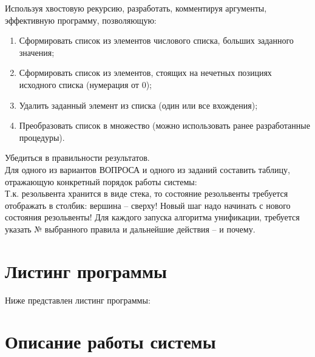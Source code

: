 \Large Используя хвостовую рекурсию, разработать, комментируя аргументы, эффективную программу, позволяющую:

\begin{enumerate}
	\item Сформировать список из элементов числового списка, больших заданного значения;
	\item Сформировать список из элементов, стоящих на нечетных позициях исходного списка (нумерация от 0);
	\item Удалить заданный элемент из списка (один или все вхождения);
	\item Преобразовать список в множество (можно использовать ранее разработанные процедуры).
\end{enumerate}
Убедиться в правильности результатов.\\
Для одного из вариантов ВОПРОСА и одного из заданий  составить таблицу, отражающую конкретный порядок работы системы: \\
Т.к. резольвента хранится в виде стека, то состояние резольвенты требуется отображать в столбик: вершина – сверху! Новый шаг надо начинать с нового состояния резольвенты! Для каждого запуска алгоритма унификации, требуется указать № выбранного правила и дальнейшие действия – и почему.



\newpage
\section*{Листинг программы}
Ниже представлен листинг программы:


\section*{Описание работы системы}

